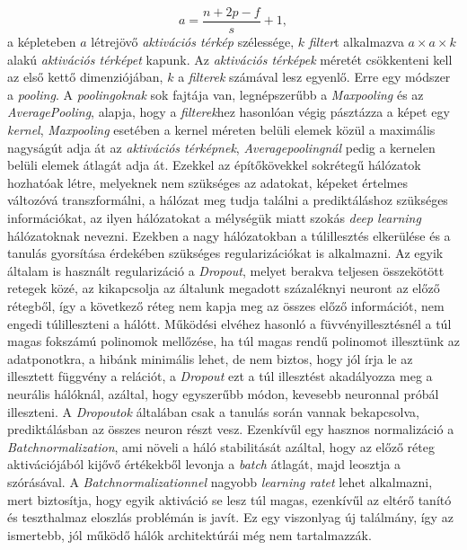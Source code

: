 \documentclass[12pt,letterpaper,oneside,openright]{book}
\begin{document}
\begin{equation}
a = \frac{n+2p-f}{s} +1,
\end{equation}
a képleteben $a$ létrejövő \textit{aktivációs térkép} szélessége, $k$ \textit{filter}t alkalmazva $a\times a\times k$ alakú \textit{aktivációs térképet} kapunk. Az \textit{aktivációs térképek} méretét csökkenteni kell az első kettő dimenziójában, $k$ a \textit{filterek} számával lesz egyenlő. Erre egy módszer a \textit{pooling}. A \textit{poolingoknak} sok fajtája van, legnépszerűbb a \textit{Maxpooling} és az \textit{AveragePooling}, alapja, hogy a \textit{filterek}hez hasonlóan végig pásztázza a képet egy \textit{kernel},  \textit{Maxpooling} esetében a kernel méreten belüli elemek közül a maximális nagyságút adja át az \textit{aktivációs térképnek}, \textit{Averagepoolingnál} pedig a kernelen belüli elemek átlagát adja át. 
\newline\indent
Ezekkel az építőkövekkel sokrétegű hálózatok hozhatóak létre, melyeknek nem szükséges az adatokat, képeket értelmes változóvá transzformálni, a hálózat meg tudja találni a prediktáláshoz szükséges információkat, az ilyen hálózatokat a mélységük miatt szokás \textit{deep learning} hálózatoknak nevezni. Ezekben a nagy hálózatokban a túlillesztés elkerülése és a tanulás gyorsítása érdekében szükséges regularizációkat is alkalmazni. Az egyik általam is használt regularizáció a \textit{Dropout}, melyet berakva teljesen összekötött retegek közé, az kikapcsolja az általunk megadott százaléknyi neuront az előző rétegből, így a következő réteg nem kapja meg az összes előző információt, nem engedi túlilleszteni a hálótt. Működési elvéhez hasonló a füvvényillesztésnél a túl magas fokszámú polinomok mellőzése, ha túl magas rendű polinomot illesztünk az adatponotkra, a hibánk minimális lehet, de nem biztos, hogy jól írja le az illesztett függvény a relációt, a \textit{Dropout} ezt a túl illesztést akadályozza meg a neurális hálóknál, azáltal, hogy egyszerűbb módon, kevesebb neuronnal próbál illeszteni. A \textit{Dropoutok} általában csak a tanulás során vannak bekapcsolva, prediktálásban az összes neuron részt vesz. Ezenkívűl egy hasznos normalizáció a \textit{Batchnormalization}, ami növeli a háló stabilitását azáltal, hogy az előző réteg aktivációjából kijővő értékekből levonja a \textit{batch} átlagát, majd leosztja a szórásával. A \textit{Batchnormalizationnel} nagyobb \textit{learning ratet} lehet alkalmazni, mert biztosítja, hogy egyik aktiváció se lesz túl magas, ezenkívűl az eltérő tanító és teszthalmaz eloszlás problémán is javít. Ez egy viszonlyag új találmány, így az ismertebb, jól működő hálók architektúrái még nem tartalmazzák.
\end{document}
